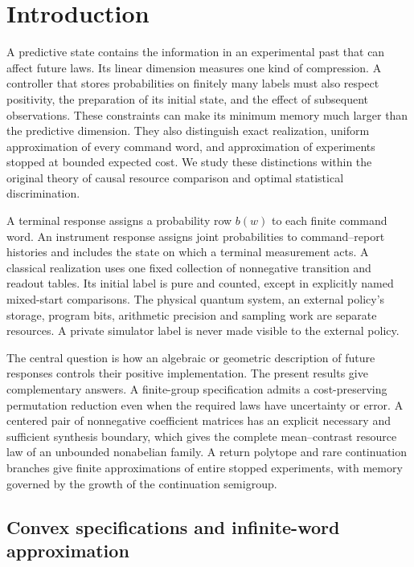 \section{Introduction}\label{sec:current-overview}\label{sec:introduction}

A predictive state contains the information in an experimental past that
can affect future laws. Its linear dimension measures one kind of
compression. A controller that stores probabilities on finitely many
labels must also respect positivity, the preparation of its initial
state, and the effect of subsequent observations. These constraints can
make its minimum memory much larger than the predictive dimension.
They also distinguish exact realization, uniform approximation of every
command word, and approximation of experiments stopped at bounded
expected cost. We study these distinctions within the original theory
of causal resource comparison and optimal statistical discrimination.

A terminal response assigns a probability row $b(w)$ to each finite
command word. An instrument response assigns joint probabilities to
command--report histories and includes the state on which a terminal
measurement acts. A classical realization uses one fixed collection
of nonnegative transition and readout tables. Its initial label is pure
and counted, except in explicitly named mixed-start comparisons.
The physical quantum system, an external policy's storage, program bits,
arithmetic precision and sampling work are separate resources. A private
simulator label is never made visible to the external policy.

The central question is how an algebraic or geometric description of
future responses controls their positive implementation. The present
results give complementary answers. A finite-group specification admits
a cost-preserving permutation reduction even when the required laws
have uncertainty or error. A centered pair of nonnegative coefficient
matrices has an explicit necessary and sufficient synthesis boundary,
which gives the complete mean--contrast resource law of an unbounded
nonabelian family. A return polytope and rare continuation branches give
finite approximations of entire stopped experiments, with memory governed
by the growth of the continuation semigroup.

\subsection*{Convex specifications and infinite-word approximation}

